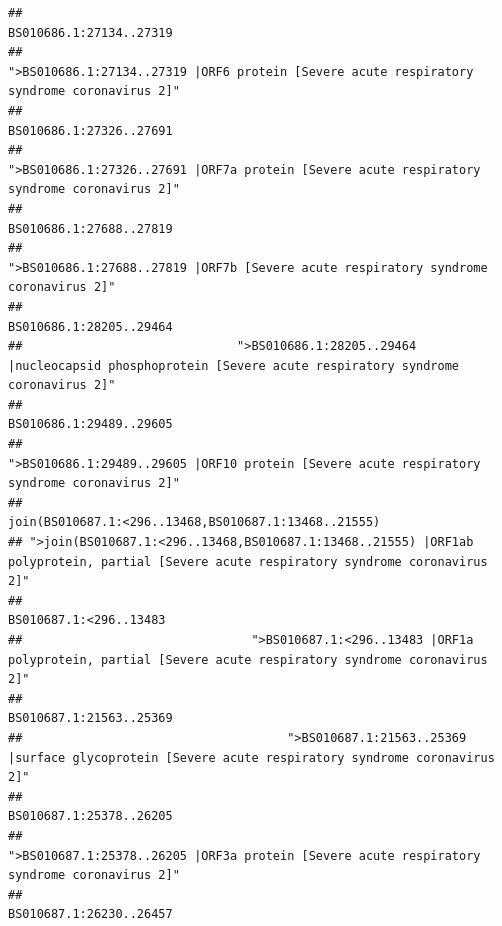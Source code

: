 \documentclass[
]{article}
\begin{document}
\begin{verbatim}
##                                                                                                                BS010686.1:27134..27319 
##                                             ">BS010686.1:27134..27319 |ORF6 protein [Severe acute respiratory syndrome coronavirus 2]" 
##                                                                                                                BS010686.1:27326..27691 
##                                            ">BS010686.1:27326..27691 |ORF7a protein [Severe acute respiratory syndrome coronavirus 2]" 
##                                                                                                                BS010686.1:27688..27819 
##                                                    ">BS010686.1:27688..27819 |ORF7b [Severe acute respiratory syndrome coronavirus 2]" 
##                                                                                                                BS010686.1:28205..29464 
##                              ">BS010686.1:28205..29464 |nucleocapsid phosphoprotein [Severe acute respiratory syndrome coronavirus 2]" 
##                                                                                                                BS010686.1:29489..29605 
##                                            ">BS010686.1:29489..29605 |ORF10 protein [Severe acute respiratory syndrome coronavirus 2]" 
##                                                                                   join(BS010687.1:<296..13468,BS010687.1:13468..21555) 
## ">join(BS010687.1:<296..13468,BS010687.1:13468..21555) |ORF1ab polyprotein, partial [Severe acute respiratory syndrome coronavirus 2]" 
##                                                                                                                 BS010687.1:<296..13483 
##                                ">BS010687.1:<296..13483 |ORF1a polyprotein, partial [Severe acute respiratory syndrome coronavirus 2]" 
##                                                                                                                BS010687.1:21563..25369 
##                                     ">BS010687.1:21563..25369 |surface glycoprotein [Severe acute respiratory syndrome coronavirus 2]" 
##                                                                                                                BS010687.1:25378..26205 
##                                            ">BS010687.1:25378..26205 |ORF3a protein [Severe acute respiratory syndrome coronavirus 2]" 
##                                                                                                                BS010687.1:26230..26457 

\end{verbatim}
\end{document}
